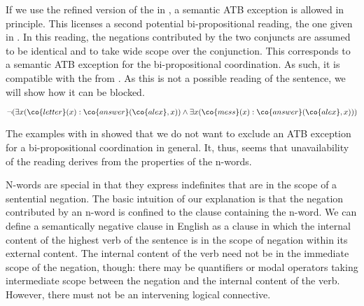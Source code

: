 \documentclass[output=paper]{langsci/langscibook}
\begin{document}


\medskip%
If we use the refined version of the \CCB{} in , 
a semantic ATB exception is allowed in principle.
This licenses a second potential bi-propositional reading, the one given in .
In this reading, the negations contributed by the two conjuncts are assumed to be identical and to take wide scope over the conjunction. This corresponds to a semantic ATB exception for the bi-propositional coordination. As such, it is compatible with the \SemATB{} from . 
As this is not a possible reading of the sentence, we will show how it can be blocked.

\ea \label{ex-brief-mail-biWide}
$\lnot (\exists x (\co{letter}(x) : \co{answer}(\co{alex},x))
\land \exists x (\co{mess}(x) : \co{answer}(\co{alex},x)))$
\z 

The examples with  in  showed that we do not want to exclude an ATB exception for a bi-propositional coordination in general. It, thus, seems that unavailability of the reading derives from the properties of the n-words.

N-words are special in that they express indefinites that are in the scope of a sentential negation. 
The basic intuition of our explanation is that the negation contributed by an n-word is confined to the clause containing the n-word. 
We can define a semantically negative clause in English as a clause in which the internal content of the highest verb of the sentence is in the scope of negation within its external content. 
The internal content of the verb need not be in the immediate scope of the negation, though: there may be quantifiers or modal operators taking intermediate scope between the negation and the internal content of the verb. However, there must not be an intervening logical connective.%
\end{document}
